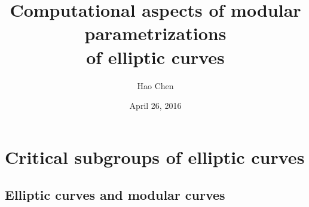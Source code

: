 \documentclass[handout]{beamer}
\title[thesis defense]{Computational aspects of modular parametrizations \\ of elliptic curves} %
\author{Hao Chen} %
\institute[UW] %
{
University of Washington Ph.D. defense \\ %
\medskip
Advisor: William Stein %
}
\date{April 26, 2016} %
\begin{document}
\begin{frame}
\titlepage %
\end{frame}


%



\section{Critical subgroups of elliptic curves} %

 \begin{frame}
 \frametitle{\insertsection}
 \tableofcontents[currentsection]
 \end{frame}

\subsection{Elliptic curves and modular curves}
\end{document}
